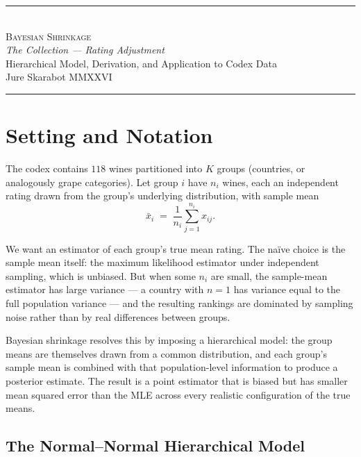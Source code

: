 \documentclass[11pt]{article}
\begin{document}
\begin{center}
    {\color{bordeaux}\rule{\textwidth}{0.4pt}}\\[0.6em]
    {\Large\scshape\color{bordeaux} Bayesian Shrinkage}\\[0.4em]
    {\itshape\color{bordeaux} The Collection --- Rating Adjustment}\\[0.4em]
    Hierarchical Model, Derivation, and Application to Codex Data\\[0.6em]
    Jure Skarabot \quad\textbullet\quad MMXXVI\\[0.4em]
    {\color{bordeaux}\rule{\textwidth}{0.4pt}}
\end{center}
\vspace{0.5em}

\section{Setting and Notation}

The codex contains $118$ wines partitioned into $K$ groups (countries, or
analogously grape categories). Let group $i$ have $n_i$ wines, each an
independent rating drawn from the group's underlying distribution, with
sample mean
\[
    \bar{x}_i \;=\; \frac{1}{n_i}\sum_{j=1}^{n_i} x_{ij}.
\]

We want an estimator of each group's true mean rating. The naïve choice is
the sample mean itself: the maximum likelihood estimator under independent
sampling, which is unbiased. But when some $n_i$ are small, the
sample-mean estimator has large variance --- a country with $n = 1$ has
variance equal to the full population variance --- and the resulting
rankings are dominated by sampling noise rather than by real differences
between groups.

Bayesian shrinkage resolves this by imposing a hierarchical model: the
group means are themselves drawn from a common distribution, and each
group's sample mean is combined with that population-level information to
produce a posterior estimate. The result is a point estimator that is
biased but has smaller mean squared error than the MLE across every
realistic configuration of the true means.

\subsection{The Normal--Normal Hierarchical Model}
\end{document}
